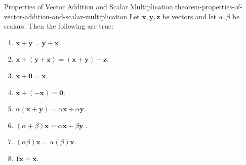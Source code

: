 \documentclass[10pt,]{book}
\numberwithin{equation}{section}
\newcommand{\vv}[1]{\mathbf{#1}}
\begin{document}
\begin{theorem}{Properties of Vector Addition and Scalar Multiplication.}{}{theorem-properties-of-vector-addition-and-scalar-multiplication}%
\hypertarget{p-1098}{}%
Let \(\vv{x},\vv{y},\vv{z}\) be vectors and let \(\alpha,\beta\) be scalars. Then the following are true:%
\leavevmode%
\begin{multicols}{2}
\begin{enumerate}
\item\hypertarget{li-110}{}\hypertarget{p-1099}{}%
\(\vv{x}+\vv{y} = \vv{y}+\vv{x}\).%
\item\hypertarget{li-111}{}\hypertarget{p-1100}{}%
\(\vv{x}+(\vv{y}+\vv{z}) = (\vv{x}+\vv{y})+\vv{z}.\)%
\item\hypertarget{li-112}{}\hypertarget{p-1101}{}%
\(\vv{x}+\vv{0} = \vv{x}.\)%
\item\hypertarget{li-113}{}\hypertarget{p-1102}{}%
\(\vv{x}+(-\vv{x}) = \vv{0}.\)%
\item\hypertarget{li-114}{}\hypertarget{p-1103}{}%
\(\alpha(\vv{x}+\vv{y}) = \alpha\vv{x}+\alpha\vv{y}.\)%
\item\hypertarget{li-115}{}\hypertarget{p-1104}{}%
\((\alpha+\beta)\vv{x} = \alpha\vv{x}+\beta\vv{y}\)%
. \item\hypertarget{li-116}{}\hypertarget{p-1105}{}%
\((\alpha\beta)\vv{x} = \alpha(\beta)\vv{x}.\)%
\item\hypertarget{li-117}{}\hypertarget{p-1106}{}%
\(1\vv{x} = \vv{x}.\)%
\end{enumerate}
\end{multicols}
\end{theorem}
%
%
\typeout{************************************************}
\typeout{************************************************}
%
\end{document}
